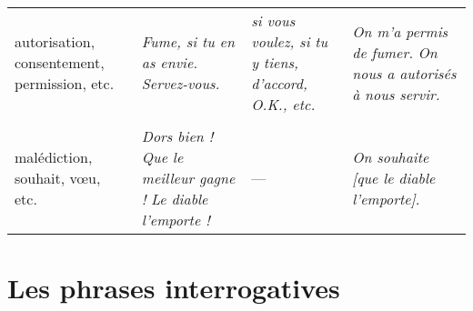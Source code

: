 \documentclass[UTF8]{report}
\begin{document}
\begin{table}[H]
\begin{adjustbox}{max width=\textwidth}
\begin{tabular}{|p{}|p{}|p{}|p{}|}
\rowcolor{cyan!10}
\multicolumn{4}{|l|}{\textbf{PERMISSION}} \\
\hline

autorisation, consentement, permission, etc. &
\textit{Fume, si tu en as envie.} \newline \textit{Servez-vous.} &
\textit{si vous voulez, si tu y tiens, d’accord, O.K., etc.} &
\textit{On m’a permis de fumer.} \newline
\textit{On nous a autorisés à nous servir.} \\
\hline

\rowcolor{cyan!10}
\multicolumn{4}{|l|}{\textbf{SOUHAIT}} \\
\hline

malédiction, souhait, vœu, etc. &
\textit{Dors bien !} \newline \textit{Que le meilleur gagne !} \newline \textit{Le diable l’emporte !} &
--- &
\textit{On souhaite [que le diable l’emporte].} \\
\hline

\end{tabular}
\end{adjustbox}

\end{table}

\section{Les phrases interrogatives}
\end{document}
